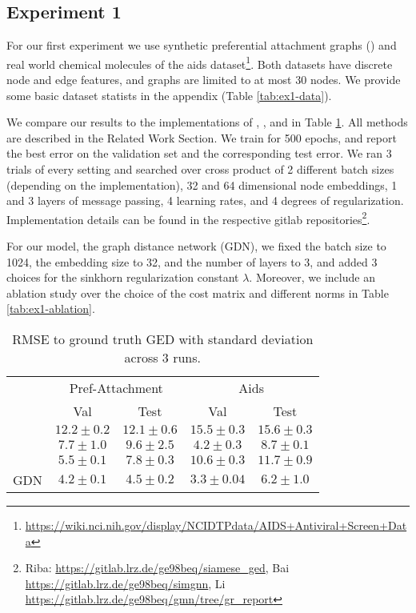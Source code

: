 \subsection{Experiment 1}

For our first experiment we use synthetic preferential attachment graphs (\citealp{pref_att2002}) and real world chemical molecules of the aids dataset\footnote{\url{https://wiki.nci.nih.gov/display/NCIDTPdata/AIDS+Antiviral+Screen+Data}}. Both datasets have discrete node and edge features, and graphs are limited to at most 30 nodes. We provide some basic dataset statists in the appendix (Table \ref{tab:ex1-data}).

We compare our results to the implementations of \cite{riba2018}, \cite{bai2019}, and \cite{li2019} in Table \ref{tab:ex1-baselines}. All methods are described in the Related Work Section. We train for 500 epochs, and report the best error on the validation set and the corresponding test error. We ran 3 trials of every setting and searched over cross product of 2 different batch sizes (depending on the implementation), 32 and 64 dimensional node embeddings, 1 and 3 layers of message passing, 4 learning rates, and 4 degrees of regularization. Implementation details can be found in the respective gitlab repositories\footnote{Riba: \url{https://gitlab.lrz.de/ge98beq/siamese_ged}, Bai \url{https://gitlab.lrz.de/ge98beq/simgnn}, Li \url{https://gitlab.lrz.de/ge98beq/gmn/tree/gr_report}}.

For our model, the graph distance network (GDN), we fixed the batch size to 1024, the embedding size to 32, and the number of layers to 3, and added 3 choices for the sinkhorn regularization constant $\lambda$. Moreover, we include an ablation study over the choice of the cost matrix and different norms in Table \ref{tab:ex1-ablation}.

\begin{table}[htbp]
    \addtolength{\tabcolsep}{-1pt}
    \fontsize{9pt}{10.25pt}\selectfont
    \centering
    \renewcommand{\arraystretch}{1.2}
    \begin{tabular}{|l|c|c|c|c|}
        \hline
        \multirow{2}{*}{} & \multicolumn{2}{c|}{Pref-Attachment} & \multicolumn{2}{c|}{Aids} \\ \hhline{|~|-|-|-|-|}
        & Val & Test & Val & Test \\ \hhline{|=|=|=|=|=|}
        \cite{riba2018} & $12.2 \pm 0.2$ & $12.1 \pm 0.6$ & $15.5 \pm 0.3$  & $15.6 \pm 0.3$ \\ \hline
        \cite{bai2019} & $7.7 \pm 1.0$ & $9.6 \pm 2.5$ & $4.2 \pm 0.3$ & $8.7 \pm 0.1$ \\ \hline
        \cite{li2019} & $5.5 \pm 0.1 $ & $7.8 \pm 0.3$ & $10.6 \pm 0.3$ & $11.7 \pm 0.9$ \\ \hline
        GDN & $4.2 \pm 0.1$ & $\boldsymbol{4.5 \pm 0.2}$ & $3.3 \pm 0.04$ & $\boldsymbol{6.2 \pm 1.0}$ \\ \hline
    \end{tabular}
    \caption{RMSE to ground truth GED with standard deviation across 3 runs.}
    \label{tab:ex1-baselines}
\end{table}

